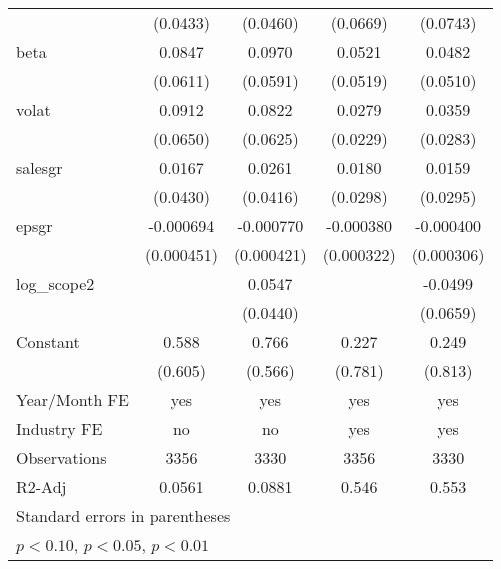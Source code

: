 \begin{table}[htbp]
\begin{tabular}{l*{4}{c}}
                    &    (0.0433)         &    (0.0460)         &    (0.0669)         &    (0.0743)         \\
[1em]
beta                &      0.0847         &      0.0970         &      0.0521         &      0.0482         \\
                    &    (0.0611)         &    (0.0591)         &    (0.0519)         &    (0.0510)         \\
[1em]
volat               &      0.0912         &      0.0822         &      0.0279         &      0.0359         \\
                    &    (0.0650)         &    (0.0625)         &    (0.0229)         &    (0.0283)         \\
[1em]
salesgr             &      0.0167         &      0.0261         &      0.0180         &      0.0159         \\
                    &    (0.0430)         &    (0.0416)         &    (0.0298)         &    (0.0295)         \\
[1em]
epsgr               &   -0.000694         &   -0.000770\sym{*}  &   -0.000380         &   -0.000400         \\
                    &  (0.000451)         &  (0.000421)         &  (0.000322)         &  (0.000306)         \\
[1em]
log\_scope2          &                     &      0.0547         &                     &     -0.0499         \\
                    &                     &    (0.0440)         &                     &    (0.0659)         \\
[1em]
Constant            &       0.588         &       0.766         &       0.227         &       0.249         \\
                    &     (0.605)         &     (0.566)         &     (0.781)         &     (0.813)         \\
\hline
Year/Month FE       &         yes         &         yes         &         yes         &         yes         \\
Industry FE         &          no         &          no         &         yes         &         yes         \\
Observations        &        3356         &        3330         &        3356         &        3330         \\
R2-Adj              &      0.0561         &      0.0881         &       0.546         &       0.553         \\
\hline\hline
\multicolumn{5}{l}{\footnotesize Standard errors in parentheses}\\
\multicolumn{5}{l}{\footnotesize \sym{*} \(p<0.10\), \sym{**} \(p<0.05\), \sym{***} \(p<0.01\)}\\
\end{tabular}
\end{table}
